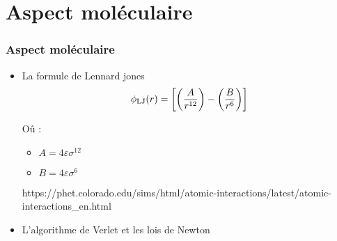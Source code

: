 \section{Aspect moléculaire}

\begin{frame}
\frametitle{Aspect moléculaire}
\begin{itemize}
\item{La formule de Lennard jones }
     \begin{displaymath}
     \phi_{\rm LJ} (r) =  \left[ \left(\frac{A}{r^{12}}\right) - \left(\frac{B}{r^{6}}\right) \right]\end{displaymath}
    
    Oû :
    \begin{itemize}
        \item $ A = 4 \varepsilon \sigma ^{12}$
        \item $ B = 4 \varepsilon \sigma ^{6}$
    \end{itemize}

https://phet.colorado.edu/sims/html/atomic-interactions/latest/atomic-interactions_en.html
\item{L'algorithme de Verlet et les lois de Newton}
\end{itemize}

\end{frame}